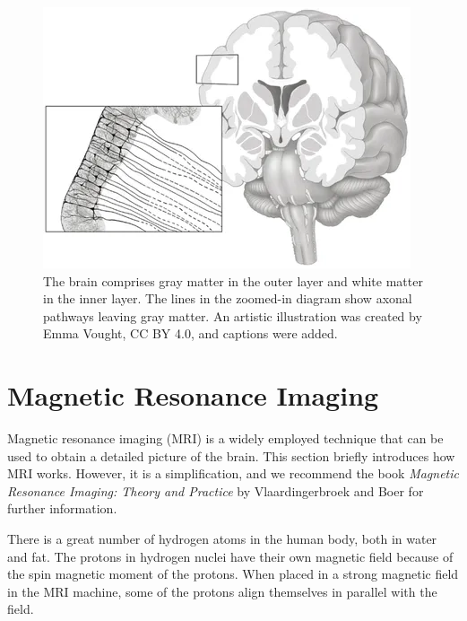 \begin{figure}
  \begin{center}
    \includegraphics[width=\textwidth]{images/manually_created/brain/brain_matter_illustration.png}
  \end{center}
  \caption[An artistic illustration of gray and white matter]{The brain comprises gray matter in the outer layer and white matter in the inner layer. The lines in the zoomed-in diagram show axonal pathways leaving gray matter. An artistic illustration was created by Emma Vought, CC BY 4.0, and captions were added. \cite{bonilha_gray_2015}}
  \label{fig:brain_matter_illustration}
\end{figure}

\section{Magnetic Resonance Imaging}\label{sec:MRI}

Magnetic resonance imaging (MRI) is a widely employed technique that can be used to obtain a detailed picture of the brain. This section briefly introduces how MRI works. However, it is a simplification, and we recommend the book \textit{Magnetic Resonance Imaging: Theory and Practice} by Vlaardingerbroek and Boer for further information. \cite{vlaardingerbroek_magnetic_2003,bear_neuroscience_2016}

There is a great number of hydrogen atoms in the human body, both in water and fat. The protons in hydrogen nuclei have their own magnetic field because of the spin magnetic moment of the protons. When placed in a strong magnetic field in the MRI machine, some of the protons align themselves in parallel with the field. \cite{cizkova_comparing_2022}

